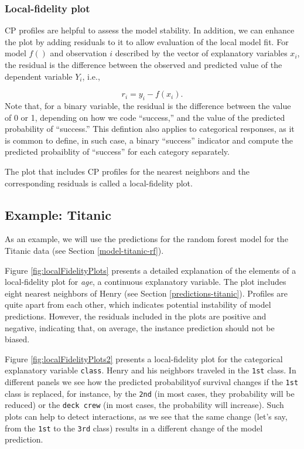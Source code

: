 \documentclass[12pt,]{krantz}
\theoremstyle{definition}
\theoremstyle{definition}
\theoremstyle{definition}
\theoremstyle{remark}
\begin{document}
\hypertarget{cPLocDiagLFplot}{%
\subsubsection{Local-fidelity plot}\label{cPLocDiagLFplot}}

CP profiles are helpful to assess the model stability. In addition, we
can enhance the plot by adding residuals to it to allow evaluation of
the local model fit. For model \(f()\) and observation \(i\) described
by the vector of explanatory variables \(x_i\), the residual is the
difference between the observed and predicted value of the dependent
variable \(Y_i\), i.e.,

\[
r_i = y_i - f(x_i).
\] Note that, for a binary variable, the residual is the difference
between the value of 0 or 1, depending on how we code ``success,'' and
the value of the predicted probability of ``success.'' This defintion
also applies to categorical responses, as it is common to define, in
such case, a binary ``success'' indicator and compute the predicted
probaiblity of ``success'' for each category separately.

The plot that includes CP profiles for the nearest neighbors and the
corresponding residuals is called a local-fidelity plot.

\hypertarget{cPLocDiagExample}{%
\subsection{Example: Titanic}\label{cPLocDiagExample}}

As an example, we will use the predictions for the random forest model
for the Titanic data (see Section \ref{model-titanic-rf}).

Figure \ref{fig:localFidelityPlots} presents a detailed explanation of
the elements of a local-fidelity plot for \emph{age}, a continuous
explanatory variable. The plot includes eight nearest neighbors of Henry
(see Section \ref{predictions-titanic}). Profiles are quite apart from
each other, which indicates potential instability of model predictions.
However, the residuals included in the plots are positive and negative,
indicating that, on average, the instance prediction should not be
biased.

Figure \ref{fig:localFidelityPlots2} presents a local-fidelity plot for
the categorical explanatory variable \texttt{class}. Henry and his
neighbors traveled in the \texttt{1st} class. In different panels we see
how the predicted probabilityof survival changes if the \texttt{1st}
class is replaced, for instance, by the \texttt{2nd} (in most cases,
they probability will be reduced) or the \texttt{deck\ crew} (in most
cases, the probability will increase). Such plots can help to detect
interactions, as we see that the same change (let's say, from the
\texttt{1st} to the \texttt{3rd} class) results in a different change of
the model prediction.
\end{document}

